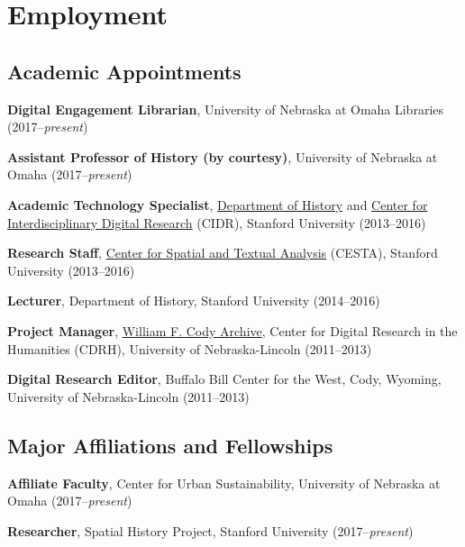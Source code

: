\section{Employment}\label{employment}

\subsection{Academic Appointments}\label{academic-appointments}

\textbf{Digital Engagement Librarian}, University of Nebraska at Omaha
Libraries (2017--\emph{present})

\textbf{Assistant Professor of History (by courtesy)}, University of
Nebraska at Omaha (2017--\emph{present})

\vspace{.3cm}

\textbf{Academic Technology Specialist},
\href{http://history.stanford.edu}{Department of History} and
\href{http://cidr.stanford.edu}{Center for Interdisciplinary Digital
Research} (CIDR), Stanford University (2013--2016)

\textbf{Research Staff}, \href{http://cesta.stanford.edu}{Center for
Spatial and Textual Analysis} (CESTA), Stanford University (2013--2016)

\textbf{Lecturer}, Department of History, Stanford University
(2014--2016)

\vspace{.3cm}

\textbf{Project Manager}, \href{http://codyarchive.org}{William F. Cody
Archive}, Center for Digital Research in the Humanities (CDRH),
University of Nebraska-Lincoln (2011--2013)

\textbf{Digital Research Editor}, Buffalo Bill Center for the West,
Cody, Wyoming, University of Nebraska-Lincoln (2011--2013)

\vspace{0.8cm}

\subsection{Major Affiliations and
Fellowships}\label{major-affiliations-and-fellowships}

\textbf{Affiliate Faculty}, Center for Urban Sustainability, University
of Nebraska at Omaha (2017--\emph{present})

\textbf{Researcher}, Spatial History Project, Stanford University
(2017--\emph{present})

